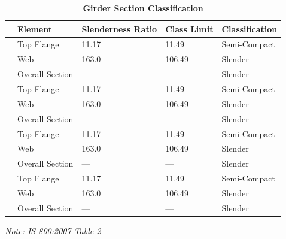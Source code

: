 \documentclass[12pt,a4paper]{report}
\numberwithin{table}{chapter}
\numberwithin{figure}{chapter}
\begin{document}
\vspace{1em}
\begin{longtable}{|C{2.5cm}|L{3cm}|C{3.5cm}|C{2.5cm}|>{\centering\arraybackslash}p{4.0cm}|}
\caption{\textbf{Girder Section Classification}}
\hline
\textbf{} & \textbf{Element} & \textbf{Slenderness Ratio} & \textbf{Class Limit} & \textbf{Classification} \\[6pt]
\hline
{} & Top Flange & 11.17 & 11.49 & Semi-Compact \\[6pt]
 & Web & 163.0 & 106.49 & Slender \\[6pt]
 & Overall Section & --- & --- & Slender \\[6pt]
\hline
{} & Top Flange & 11.17 & 11.49 & Semi-Compact \\[6pt]
 & Web & 163.0 & 106.49 & Slender \\[6pt]
 & Overall Section & --- & --- & Slender \\[6pt]
\hline
{} & Top Flange & 11.17 & 11.49 & Semi-Compact \\[6pt]
 & Web & 163.0 & 106.49 & Slender \\[6pt]
 & Overall Section & --- & --- & Slender \\[6pt]
\hline
{} & Top Flange & 11.17 & 11.49 & Semi-Compact \\[6pt]
 & Web & 163.0 & 106.49 & Slender \\[6pt]
 & Overall Section & --- & --- & Slender \\[6pt]
\hline
\end{longtable}
\noindent\textit{Note: IS 800:2007 Table 2}
\end{document}
